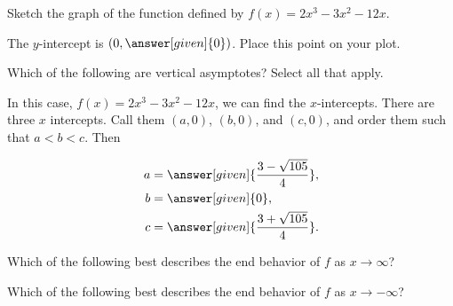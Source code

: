 \documentclass[wordchoicegiven]{ximera}
\begin{document}
\begin{example}
Sketch the graph of the function defined by $f(x)=2x^3-3x^2-12x$.

The $y$-intercept is $(0,\answer[given]{0})$. Place this point on your plot.
\begin{image}
\end{image}



Which of the following are vertical asymptotes?  Select all that apply.

\begin{selectAll}
\end{selectAll}

In this case, $f(x) =2x^3-3x^2-12x$, we can find the
$x$-intercepts.   There are three $x$ intercepts.  Call them $(a,0)$, $(b,0)$, and $(c,0)$, and order them such that $a<b<c$.  Then

\begin{align*}
  a &= \answer[given]{\frac{3-\sqrt{105}}{4}},\\
  b &= \answer[given]{0}, \\
  c &= \answer[given]{\frac{3+\sqrt{105}}{4}}.
\end{align*}


	
  Which of the following best describes the end behavior of $f$ as $x \to \infty$?		
  \begin{multipleChoice}
  \end{multipleChoice}
  Which of the following best describes the end behavior of $f$ as $x \to -\infty$?		
  \begin{multipleChoice}
  \end{multipleChoice}


\end{example}
\end{document}
